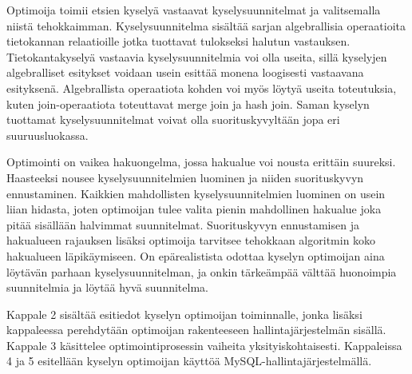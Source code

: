 \documentclass[finnish]{tktltiki2}
\theoremstyle{definition}
\theoremstyle{remark}
\begin{document}
Optimoija toimii etsien kyselyä vastaavat kyselysuunnitelmat ja valitsemalla niistä tehokkaimman. Kyselysuunnitelma sisältää sarjan algebrallisia operaatioita tietokannan relaatioille jotka tuottavat tulokseksi halutun vastauksen. Tietokantakyselyä vastaavia kyselysuunnitelmia voi olla useita, sillä kyselyjen algebralliset esitykset voidaan usein esittää monena loogisesti vastaavana esityksenä.  \cite{jarke1984} Algebrallista operaatiota kohden voi myös löytyä useita toteutuksia, kuten join-operaatiota toteuttavat merge join ja hash join. Saman kyselyn tuottamat kyselysuunnitelmat voivat olla suorituskyvyltään jopa eri suuruusluokassa. \cite{oracle2013refman}	

Optimointi on vaikea hakuongelma, jossa hakualue voi nousta erittäin suureksi. \cite{chaudhuri1998} Haasteeksi nousee kyselysuunnitelmien luominen ja niiden suorituskyvyn ennustaminen. Kaikkien mahdollisten kyselysuunnitelmien luominen on usein liian hidasta, joten optimoijan tulee valita pienin mahdollinen hakualue joka pitää sisällään halvimmat suunnitelmat. Suorituskyvyn ennustamisen ja hakualueen rajauksen lisäksi optimoija tarvitsee tehokkaan algoritmin koko hakualueen läpikäymiseen. On epärealistista odottaa kyselyn optimoijan aina löytävän parhaan kyselysuunnitelman, ja onkin tärkeämpää välttää huonoimpia suunnitelmia ja löytää hyvä suunnitelma. \cite{ramakrishnan2003database}

Kappale 2 sisältää esitiedot kyselyn optimoijan toiminnalle, jonka lisäksi kappaleessa perehdytään optimoijan rakenteeseen hallintajärjestelmän sisällä.  Kappale 3 käsittelee optimointiprosessin vaiheita yksityiskohtaisesti. Kappaleissa 4 ja 5 esitellään kyselyn optimoijan käyttöä MySQL-hallintajärjestelmällä.

%
%
\end{document}
